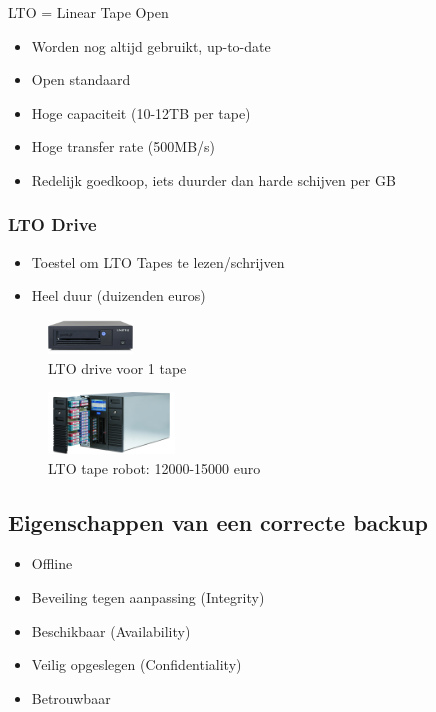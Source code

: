 \documentclass{article}
\begin{document}
LTO = Linear Tape Open

\begin{itemize}
    \item Worden nog altijd gebruikt, up-to-date
    \item Open standaard
    \item Hoge capaciteit (10-12TB per tape)
    \item Hoge transfer rate (500MB/s)
    \item Redelijk goedkoop, iets duurder dan harde schijven per GB
\end{itemize}

\subsubsection{LTO Drive}


\begin{itemize}
    \item Toestel om LTO Tapes te lezen/schrijven
    \item Heel duur (duizenden euros)
\end{itemize}

\begin{figure}[H]
    \centering
    \includegraphics[width=0.2\textwidth]{lto-drive-single.png}
    \caption{LTO drive voor 1 tape}
\end{figure}

\begin{figure}[H]
    \centering
    \includegraphics[width=0.3\textwidth]{lto-drive-multi.png}
    \caption{LTO tape robot: 12000-15000 euro}
\end{figure}


\subsection{Eigenschappen van een correcte backup}

\begin{itemize}
    \item Offline
    \item Beveiling tegen aanpassing (Integrity)
    \item Beschikbaar (Availability)
    \item Veilig opgeslegen (Confidentiality)
    \item Betrouwbaar 
\end{itemize}
\end{document}
